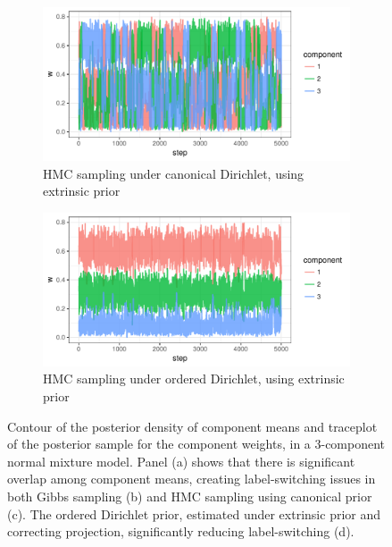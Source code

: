 \documentclass[10pt]{article}
\DeclareMathOperator{\1}{\mathbbm{1}}
\begin{document}
\begin{figure}[H]
\begin{subfigure}[b]{0.32\textwidth}
  \includegraphics[width=1\textwidth]{fmm_w_hmc_unordered.pdf}
    \caption{HMC sampling under canonical Dirichlet, using extrinsic prior}
      \end{subfigure}
       \begin{subfigure}[b]{0.32\textwidth}
 \includegraphics[width=1\textwidth]{fmm_w_hmc.pdf}
     \caption{HMC sampling under ordered Dirichlet, using extrinsic prior}
     \end{subfigure}
\caption{Contour of the posterior density of component means and traceplot of the posterior sample for the component weights, in a 3-component normal mixture model. Panel (a) shows that there is significant overlap among component means, creating label-switching issues in both Gibbs sampling (b) and HMC sampling using canonical prior (c). The ordered Dirichlet prior, estimated under extrinsic prior and correcting projection, significantly reducing label-switching (d).}
\label{dirichlet}
\end{figure}
\end{document}

